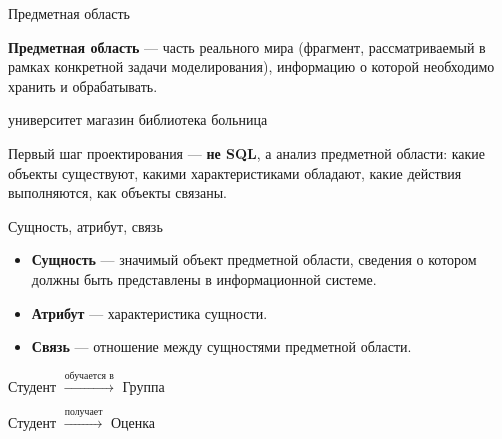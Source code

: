 \documentclass[aspectratio=169]{beamer}
\begin{document}

\begin{frame}{Предметная область}

\textbf{Предметная область} — часть реального мира
(фрагмент, рассматриваемый в рамках конкретной задачи
моделирования), информацию о которой необходимо
хранить и обрабатывать.

\vspace{0.4cm}

\begin{center}
\Large
университет \quad магазин \quad библиотека \quad больница
\end{center}

\vspace{0.4cm}

Первый шаг проектирования — \textbf{не SQL},
а анализ предметной области: какие объекты существуют,
какими характеристиками обладают, какие действия
выполняются, как объекты связаны.

\end{frame}


\begin{frame}{Сущность, атрибут, связь}

\begin{itemize}
  \item \textbf{Сущность} — значимый объект предметной
        области, сведения о котором должны быть
        представлены в информационной системе.
  \item \textbf{Атрибут} — характеристика сущности.
  \item \textbf{Связь} — отношение между сущностями
        предметной области.
\end{itemize}

\vspace{0.4cm}

\begin{center}
\Large
Студент
$\xrightarrow{\text{обучается в}}$
Группа
\end{center}

\begin{center}
\Large
Студент
$\xrightarrow{\text{получает}}$
Оценка
\end{center}

\end{frame}
\end{document}
